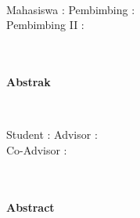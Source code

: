 \IDon
\begin{center}
	\large{\textbf{\titleID}}\\
	\vspace{10mm}
\end{center}
\large{Mahasiswa : \studentName \hfill Pembimbing : \advisorName} \\
\phantom{co} \hfill Pembimbing II : \coAdvisorName \\
\begin{center}
	\large{\departmentID}\\
	\vspace{5mm}
	\large{\universityID}\\
	\vspace{5mm}
	\large{\textbf{Abstrak}}\\
\end{center}
\vspace{5mm}
\doublespace

\IDoff

\newpage
\ENon
\onehalfspace
\begin{center}
	\large{\textbf{\titleEN}}\\
	\vspace{10mm}
\end{center}
Student : \studentName \hfill Advisor : \advisorName \\
\phantom{co} \hfill Co-Advisor : \coAdvisorName \\
\begin{center}
	\large{\departmentEN}\\
	\vspace{5mm}
	\large{\universityEN}\\
	\vspace{5mm}
	\large{\textbf{Abstract}}\\
\end{center}
\vspace{3mm}
\doublespace

\ENoff
